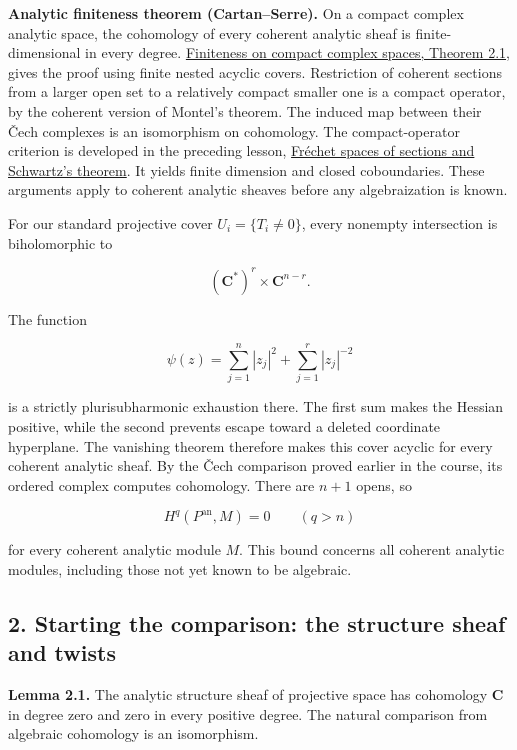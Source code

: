 \documentclass[11pt]{article}
\begin{document}
\textbf{Analytic finiteness theorem (Cartan--Serre).} On a compact
complex analytic space, the cohomology of every coherent analytic sheaf
is finite-dimensional in every degree.
\href{../complex-analytic-spaces-and-coherent-sheaves/finiteness-on-compact-complex-spaces.html\#2-the-finiteness-theorem}{Finiteness
on compact complex spaces, Theorem 2.1}, gives the proof using finite
nested acyclic covers. Restriction of coherent sections from a larger
open set to a relatively compact smaller one is a compact operator, by
the coherent version of Montel's theorem. The induced map between their
Čech complexes is an isomorphism on cohomology. The compact-operator
criterion is developed in the preceding lesson,
\href{../complex-analytic-spaces-and-coherent-sheaves/frechet-spaces-of-sections-and-schwartzs-theorem.html}{Fréchet
spaces of sections and Schwartz's theorem}. It yields finite dimension
and closed coboundaries. These arguments apply to coherent analytic
sheaves before any algebraization is known.

For our standard projective cover \(U_i=\{T_i\ne0\}\), every nonempty
intersection is biholomorphic to

\[
(\mathbf C^*)^r\times\mathbf C^{n-r}.
\]

The function

\[
\psi(z)=\sum_{j=1}^n|z_j|^2+\sum_{j=1}^r|z_j|^{-2}
\]

is a strictly plurisubharmonic exhaustion there. The first sum makes the
Hessian positive, while the second prevents escape toward a deleted
coordinate hyperplane. The vanishing theorem therefore makes this cover
acyclic for every coherent analytic sheaf. By the Čech comparison proved
earlier in the course, its ordered complex computes cohomology. There
are \(n+1\) opens, so

\[
H^q(P^{\mathrm{an}},M)=0\qquad(q>n)
\tag{1}
\]

for every coherent analytic module \(M\). This bound concerns all
coherent analytic modules, including those not yet known to be
algebraic.

\subsection{2. Starting the comparison: the structure sheaf and
twists}\label{starting-the-comparison-the-structure-sheaf-and-twists}

\textbf{Lemma 2.1.} The analytic structure sheaf of projective space has
cohomology \(\mathbf C\) in degree zero and zero in every positive
degree. The natural comparison from algebraic cohomology is an
isomorphism.
\end{document}
